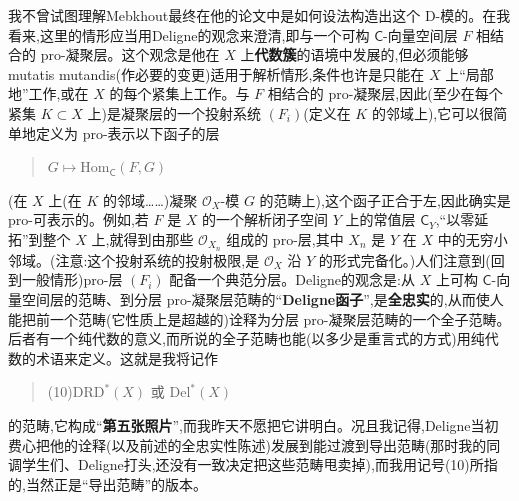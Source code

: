 \noindent 我不曾试图理解Mebkhout最终在他的论文中是如何设法构造出这个 D-模的。在我看来,这里的情形应当用Deligne的观念来澄清,即与一个可构 $\mathsf{C}$-向量空间层 $F$ 相结合的 pro-凝聚层。这个观念是他在 $X$ 上\textbf{代数簇}的语境中发展的,但必须能够 mutatis mutandis(作必要的变更)适用于解析情形,条件也许是只能在 $X$ 上“局部地”工作,或在 $X$ 的每个紧集上工作。与 $F$ 相结合的 pro-凝聚层,因此(至少在每个紧集 $K\subset X$ 上)是凝聚层的一个投射系统 $(F_{i})$(定义在 $K$ 的邻域上),它可以很简单地定义为 pro-表示以下函子的层
\begin{quote}
$G\mapsto \mathrm{Hom}_{\mathsf{C}}(F,G)$
\end{quote}
(在 $X$ 上(在 $K$ 的邻域……)凝聚 $\mathcal{O}_{X}$-模 $G$ 的范畴上),这个函子正合于左,因此确实是 pro-可表示的。例如,若 $F$ 是 $X$ 的一个解析闭子空间 $Y$ 上的常值层 $\mathsf{C}_{Y}$,“以零延拓”到整个 $X$ 上,就得到由那些 $\mathcal{O}_{X_{n}}$ 组成的 pro-层,其中 $X_{n}$ 是 $Y$ 在 $X$ 中的无穷小邻域。(注意:这个投射系统的投射极限,是 $\mathcal{O}_{X}$ 沿 $Y$ 的形式完备化。)人们注意到(回到一般情形)pro-层 $(F_{i})$ 配备一个典范分层。Deligne的观念是:从 $X$ 上可构 $\mathsf{C}$-向量空间层的范畴、到分层 pro-凝聚层范畴的“\textbf{Deligne函子}”\dmark{},是\textbf{全忠实}的,从而使人能把前一个范畴(它性质上是超越的)诠释为分层 pro-凝聚层范畴的一个全子范畴。后者有一个纯代数的意义,而所说的全子范畴也能(以多少是重言式的方式)用纯代数的术语来定义。这就是我将记作
\begin{quote}
(10)\quad $\mathrm{DRD}^{*}(X)$ 或 $\mathrm{Del}^{*}(X)$
\end{quote}
的范畴,它构成“\textbf{第五张照片}”,而我昨天不愿把它讲明白。况且我记得,Deligne当初费心把他的诠释(以及前述的全忠实性陈述)发展到能过渡到导出范畴(那时我的同调学生们、Deligne打头,还没有一致决定把这些范畴甩卖掉),而我用记号(10)所指的,当然正是“导出范畴”的版本。

